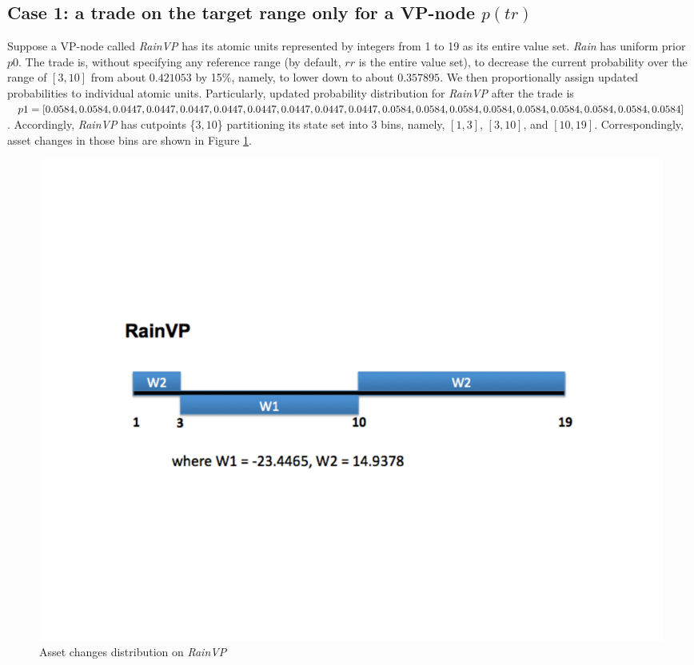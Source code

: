 \documentclass[onecolumn]{article}
\begin{document}
\subsection{Case 1: a trade on the target range only for a VP-node $p(tr)$}
Suppose a VP-node called \textit{RainVP} has its atomic units represented by integers from 1 to 19 as its entire value set. \textit{Rain} has uniform prior $p0$. The trade is, without specifying any reference range (by default, $rr$ is the entire value set), to decrease the current probability over the range of $[3,10]$ from about $0.421053$ by 15\%, namely, to lower down to about  $0.357895$. We then proportionally assign updated probabilities to individual atomic units.  Particularly, updated probability distribution for \textit{RainVP} after the trade is $p1=[0.0584, 0.0584, 0.0447, 0.0447, 0.0447, 0.0447, 0.0447, 0.0447, 0.0447, \\0.0447, 0.0584, 0.0584, 0.0584, 0.0584, 0.0584, 0.0584, 0.0584, 0.0584, 0.0584]$. Accordingly, \textit{RainVP} has cutpoints \{$3,10$\} partitioning its state set into $3$ bins, namely, $[1,3]$, $[3,10]$, and $[10, 19]$. Correspondingly, asset changes in those bins are shown in Figure \ref{fig:assetchange1}.

\begin{figure}[tbh]
    \centering    
    \includegraphics[scale=0.65]{DAC_VP_figure/assetchange1_rainVP.pdf}     
    \caption{Asset changes distribution on \textit{RainVP}} 
    \label{fig:assetchange1} 
\end{figure}
\end{document}
